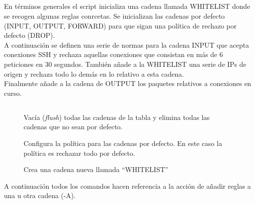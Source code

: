 \documentclass[10pt,a4paper]{article}
\begin{document}
\subsection{}
En términos generales el script inicializa una cadena llamada WHITELIST donde se recogen algunas reglas conrcetas. Se inicializan las cadenas por defecto (INPUT, OUTPUT, FORWARD) para que sigan una política de rechazo por defecto (DROP).\\

A continuación se definen una serie de normas para la cadena INPUT que acepta conexiones SSH y rechaza aquellas conexiones que consistan en más de 6 peticiones en 30 segundos. También añade a la WHITELIST una serie de IPs de origen y rechaza todo lo demás en lo relativo a esta cadena.\\

Finalmente añade a la cadena de OUTPUT los paquetes relativos a conexiones en curso.

\subsection{}

\begin{figure}[htpb]
	

\end{figure}

\begin{figure}[htpb]
	
        \caption{Vacía (\textit{flush}) todas las cadenas de la tabla y elimina todas las cadenas que no sean por defecto.}
\end{figure}

\begin{figure}[htpb]
	
    \caption{Configura la política para las cadenas por defecto. En este caso la política es rechazar todo por defecto.}
\end{figure}

\begin{figure}[htpb]
	
    \caption{Crea una cadena nueva llamada ``WHITELIST''}
\end{figure}

\pagebreak

A continuación todos los comandos hacen referencia a la acción de añadir reglas a una u otra cadena (-A).\\
\end{document}
